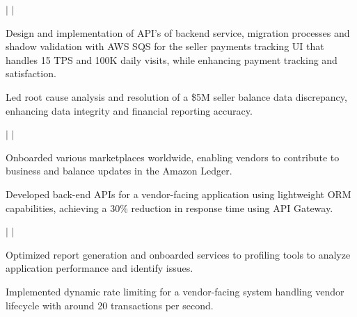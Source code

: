     \hspace{17pt}  $|$ 
     $|$
    \experienceItemListStart
        \item Design and implementation of API's of backend service, migration processes and shadow validation with AWS SQS for the seller payments tracking UI that handles 15 TPS and 100K daily visits, while enhancing payment tracking and satisfaction.
        \item Led root cause analysis and resolution of a \$5M seller balance data discrepancy, enhancing data integrity and financial reporting accuracy.
    \experienceItemListEnd

    \hspace{17pt}  $|$ 
     $|$
    \experienceItemListStart
        \item  Onboarded various marketplaces worldwide, enabling vendors to contribute to business and balance updates in the Amazon Ledger.  
        \item  Developed back-end APIs for a vendor-facing application using lightweight ORM capabilities, achieving a 30\% reduction in response time using API Gateway.  
    \experienceItemListEnd

    \hspace{17pt}  $|$
     $|$
    \experienceItemListStart
        \item  Optimized report generation and onboarded services to profiling tools to analyze application performance and identify issues.
        \item  Implemented dynamic rate limiting for a vendor-facing system handling vendor lifecycle with around 20 transactions per second. 
    \experienceItemListEnd

